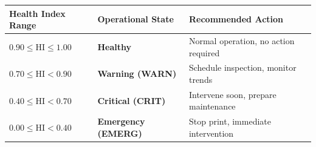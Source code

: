 \small
\begin{tabular}{|C{3.0cm}|C{3.0cm}|L{6.5cm}|}
\hline
{}
\textbf{\color{white}Health Index Range} & \textbf{\color{white}Operational State} & \textbf{\color{white}Recommended Action} \\
\hline
$0.90 \leq \text{HI} \leq 1.00$ & \textbf{Healthy} & Normal operation, no action required \\
\hline
$0.70 \leq \text{HI} < 0.90$ & \textbf{Warning (WARN)} & Schedule inspection, monitor trends \\
\hline
$0.40 \leq \text{HI} < 0.70$ & \textbf{Critical (CRIT)} & Intervene soon, prepare maintenance \\
\hline
$0.00 \leq \text{HI} < 0.40$ & \textbf{Emergency (EMERG)} & Stop print, immediate intervention \\
\hline
\end{tabular}